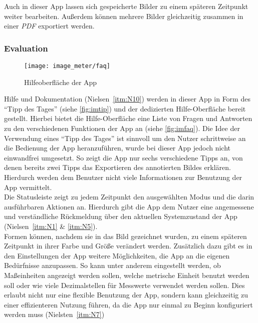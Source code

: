 Auch in dieser App lassen sich gespeicherte Bilder zu einem späteren Zeitpunkt weiter bearbeiten.
Außerdem können mehrere Bilder gleichzeitig zusammen in einer \emph{PDF} exportiert werden.

\subsubsection{Evaluation}\label{subsec:imeva}
\begin{wrapfigure}{R}{0.4\textwidth}
  \centering
  \texttt{[image: image\_meter/faq]}
  \caption{Hilfeoberfläche der App}
  \label{fig:imfaq}
\end{wrapfigure}

Hilfe und Dokumentation (Nielsen~\autoref{itm:N10}) werden in dieser App in Form des ``Tipp des Tages'' (siehe \autoref{fig:imtip}) und der dedizierten Hilfe-Oberfläche bereit gestellt.
Hierbei bietet die Hilfe-Oberfläche eine Liste von Fragen und Antworten zu den verschiedenen Funktionen der App an (siehe \autoref{fig:imfaq}). 
Die Idee der Verwendung eines ``Tipp des Tages'' ist sinnvoll um den Nutzer schrittweise an die Bedienung der App heranzuführen, wurde bei dieser App jedoch nicht einwandfrei umgesetzt.
So zeigt die App nur sechs verschiedene Tipps an, von denen bereits zwei Tipps das Exportieren des annotierten Bildes erklären.
Hierdurch werden dem Benutzer nicht viele Informationen zur Benutzung der App vermittelt. \\

Die Statusleiste zeigt zu jedem Zeitpunkt den ausgewählten Modus und die darin ausführbaren Aktionen an.
Hierdurch gibt die App dem Nutzer eine angemessene und verständliche Rückmeldung über den aktuellen Systemzustand der App (Nielsen~\autoref{itm:N1} \& \autoref{itm:N5}). \\

Formen können, nachdem sie in das Bild gezeichnet wurden, zu einem späteren Zeitpunkt in ihrer Farbe und Größe verändert werden.
Zusätzlich dazu gibt es in den Einstellungen der App weitere Möglichkeiten, die App an die eigenen Bedürfnisse anzupassen.
So kann unter anderem eingestellt werden, ob Maßeinheiten angezeigt werden sollen, welche metrische Einheit benutzt werden soll oder wie viele Dezimalstellen für Messwerte verwendet werden sollen.
Dies erlaubt nicht nur eine flexible Benutzung der App, sondern kann gleichzeitig zu einer effizienteren Nutzung führen, da die App nur einmal zu Beginn konfiguriert werden muss (Nielsten~\autoref{itm:N7}) \\

